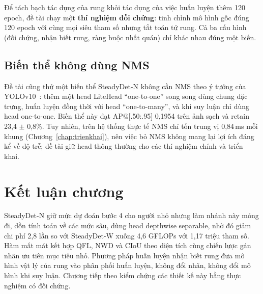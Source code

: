 Để tách bạch tác dụng của rung khỏi tác dụng của việc huấn luyện thêm 120 epoch, đề tài chạy một \textbf{thí nghiệm đối chứng}: tinh chỉnh mô hình gốc đúng 120 epoch với cùng mọi siêu tham số nhưng tắt toán tử rung. Cả ba cấu hình (đối chứng, nhận biết rung, ràng buộc nhất quán) chỉ khác nhau đúng một biến.

\subsection{Biến thể không dùng NMS}

Đề tài cũng thử một biến thể SteadyDet-N không cần NMS theo ý tưởng của YOLOv10~\cite{wang2024yolov10}: thêm một head LiteHead ``one-to-one'' song song dùng chung đặc trưng, huấn luyện đồng thời với head ``one-to-many'', và khi suy luận chỉ dùng head one-to-one. Biến thể này đạt AP@[.50:.95] 0,1954 trên ảnh sạch và retain 23,4 $\pm$ 0,8\%. Tuy nhiên, trên hệ thống thực tế NMS chỉ tốn trung vị 0,84\,ms mỗi khung (Chương~\ref{chap:trienkhai}), nên việc bỏ NMS không mang lại lợi ích đáng kể về độ trễ; đề tài giữ head thông thường cho các thí nghiệm chính và triển khai.

\section{Kết luận chương}

SteadyDet-N giữ mức dự đoán bước 4 cho người nhỏ nhưng làm nhánh này mỏng đi, dồn tính toán về các mức sâu, dùng head depthwise separable, nhờ đó giảm chi phí 2,8 lần so với SteadyDet-W xuống 4,6 GFLOPs với 1,17 triệu tham số. Hàm mất mát kết hợp QFL, NWD và CIoU theo diện tích cùng chiến lược gán nhãn ưu tiên mục tiêu nhỏ. Phương pháp huấn luyện nhận biết rung đưa mô hình vật lý của rung vào phân phối huấn luyện, không đổi nhãn, không đổi mô hình khi suy luận. Chương tiếp theo kiểm chứng các thiết kế này bằng thực nghiệm có đối chứng.
